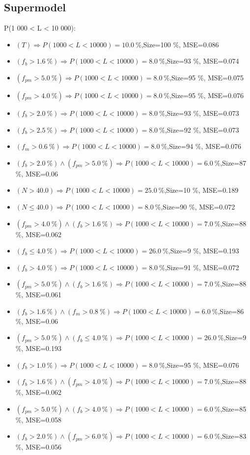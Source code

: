 \documentclass[numbered]{CSL}
\begin{document}
\subsection{Supermodel}
P(1 000 < L < 10 000):
\begin{itemize}
\item $(T) \Rightarrow P(1 000 < L < 10 000) = 10.0~\%$,\hfill Size=100 \%, MSE=0.086
\item $(f_b > 1.6~\%) \Rightarrow P(1 000 < L < 10 000) = 8.0~\%$,\hfill Size=93 \%, MSE=0.074
\item $(f_{pm} > 5.0~\%) \Rightarrow P(1 000 < L < 10 000) = 8.0~\%$,\hfill Size=95 \%, MSE=0.075
\item $(f_{pm} > 4.0~\%) \Rightarrow P(1 000 < L < 10 000) = 8.0~\%$,\hfill Size=95 \%, MSE=0.076
\item $(f_b > 2.0~\%) \Rightarrow P(1 000 < L < 10 000) = 8.0~\%$,\hfill Size=93 \%, MSE=0.073
\item $(f_b > 2.5~\%) \Rightarrow P(1 000 < L < 10 000) = 8.0~\%$,\hfill Size=92 \%, MSE=0.073
\item $(f_m > 0.6~\%) \Rightarrow P(1 000 < L < 10 000) = 8.0~\%$,\hfill Size=94 \%, MSE=0.076
\item $(f_b > 2.0~\%) \land (f_{pm} > 5.0~\%) \Rightarrow P(1 000 < L < 10 000) = 6.0~\%$,\hfill Size=87 \%, MSE=0.06
\item $(N > 40.0) \Rightarrow P(1 000 < L < 10 000) = 25.0~\%$,\hfill Size=10 \%, MSE=0.189
\item $(N \leq 40.0) \Rightarrow P(1 000 < L < 10 000) = 8.0~\%$,\hfill Size=90 \%, MSE=0.072
\item $(f_{pm} > 4.0~\%) \land (f_b > 1.6~\%) \Rightarrow P(1 000 < L < 10 000) = 7.0~\%$,\hfill Size=88 \%, MSE=0.062
\item $(f_b \leq 4.0~\%) \Rightarrow P(1 000 < L < 10 000) = 26.0~\%$,\hfill Size=9 \%, MSE=0.193
\item $(f_b > 4.0~\%) \Rightarrow P(1 000 < L < 10 000) = 8.0~\%$,\hfill Size=91 \%, MSE=0.072
\item $(f_{pm} > 5.0~\%) \land (f_b > 1.6~\%) \Rightarrow P(1 000 < L < 10 000) = 7.0~\%$,\hfill Size=88 \%, MSE=0.061
\item $(f_b > 1.6~\%) \land (f_m > 0.8~\%) \Rightarrow P(1 000 < L < 10 000) = 6.0~\%$,\hfill Size=86 \%, MSE=0.06
\item $(f_{pm} > 5.0~\%) \land (f_b \leq 4.0~\%) \Rightarrow P(1 000 < L < 10 000) = 26.0~\%$,\hfill Size=9 \%, MSE=0.193
\item $(f_b > 1.0~\%) \Rightarrow P(1 000 < L < 10 000) = 8.0~\%$,\hfill Size=95 \%, MSE=0.076
\item $(f_b > 1.6~\%) \land (f_{pm} > 4.0~\%) \Rightarrow P(1 000 < L < 10 000) = 7.0~\%$,\hfill Size=88 \%, MSE=0.062
\item $(f_{pm} > 5.0~\%) \land (f_b > 4.0~\%) \Rightarrow P(1 000 < L < 10 000) = 6.0~\%$,\hfill Size=85 \%, MSE=0.058
\item $(f_b > 2.0~\%) \land (f_{pm} > 6.0~\%) \Rightarrow P(1 000 < L < 10 000) = 6.0~\%$,\hfill Size=83 \%, MSE=0.056
\end{itemize}
\end{document}
